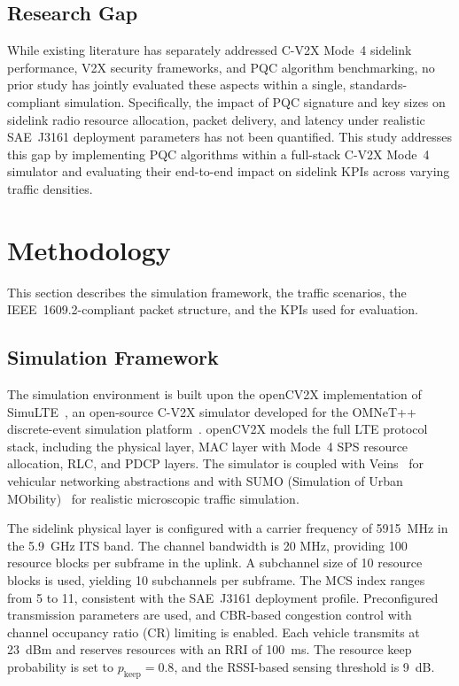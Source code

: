 \documentclass[letterpaper,journal]{IEEEtran}
\begin{document}
\subsection{Research Gap}

While existing literature has separately addressed C-V2X Mode~4 sidelink performance, V2X security frameworks, and PQC algorithm benchmarking, no prior study has jointly evaluated these aspects within a single, standards-compliant simulation. Specifically, the impact of PQC signature and key sizes on sidelink radio resource allocation, packet delivery, and latency under realistic SAE~J3161 deployment parameters has not been quantified. This study addresses this gap by implementing PQC algorithms within a full-stack C-V2X Mode~4 simulator and evaluating their end-to-end impact on sidelink KPIs across varying traffic densities.

\section{Methodology}
\label{sec:method}

This section describes the simulation framework, the traffic scenarios, the IEEE~1609.2-compliant packet structure, and the KPIs used for evaluation.

\subsection{Simulation Framework}
\label{sec:sim_framework}

The simulation environment is built upon the openCV2X implementation of SimuLTE~\cite{virdis2014simulte}, an open-source C-V2X simulator developed for the OMNeT++ discrete-event simulation platform~\cite{varga2019omnetpp}. openCV2X models the full LTE protocol stack, including the physical layer, MAC layer with Mode~4 SPS resource allocation, RLC, and PDCP layers. The simulator is coupled with Veins~\cite{sommer2019veins} for vehicular networking abstractions and with SUMO (Simulation of Urban MObility)~\cite{lopez2018sumo} for realistic microscopic traffic simulation.

The sidelink physical layer is configured with a carrier frequency of 5915~MHz in the 5.9~GHz ITS band. The channel bandwidth is 20 MHz, providing 100 resource blocks per subframe in the uplink. A subchannel size of 10 resource blocks is used, yielding 10 subchannels per subframe. The MCS index ranges from 5 to 11, consistent with the SAE~J3161 deployment profile. Preconfigured transmission parameters are used, and CBR-based congestion control with channel occupancy ratio (CR) limiting is enabled. Each vehicle transmits at 23~dBm and reserves resources with an RRI of 100~ms. The resource keep probability is set to $p_\text{keep} = 0.8$, and the RSSI-based sensing threshold is 9~dB.
\end{document}
